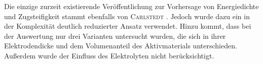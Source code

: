 Die einzige zurzeit existierende Veröffentlichung zur Vorhersage von Energiedichte und Zugsteifigkeit stammt ebenfalls von \textsc{Carlstedt} \cite{Carlstedt2018}. Jedoch wurde dazu ein in der Komplexität deutlich reduzierter Ansatz verwendet. Hinzu kommt, dass bei der Auswertung nur drei Varianten untersucht wurden, die sich in ihrer Elektrodendicke und dem Volumenanteil des Aktivmaterials unterschieden. Außerdem wurde der Einfluss des Elektrolyten nicht berücksichtigt.






   

